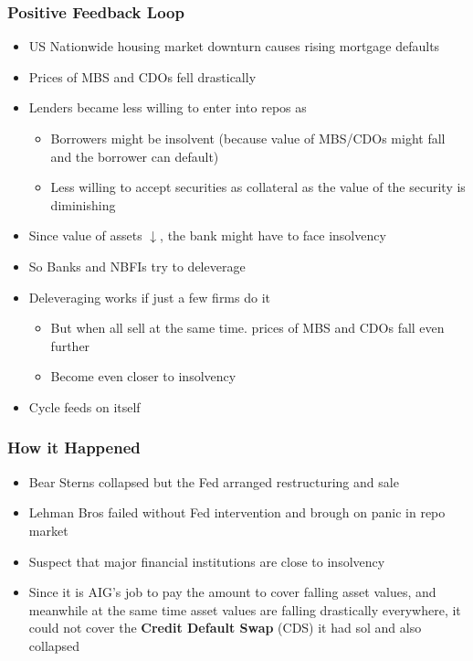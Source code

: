 \documentclass{article}
\begin{document}
\begin{multicols}{2}
\subsubsection{Positive Feedback Loop}
\begin{itemize}
	\item US Nationwide housing market downturn causes rising mortgage defaults
	\item Prices of MBS and CDOs fell drastically
	\item Lenders became less willing to enter into repos as
	\begin{itemize}
		\item Borrowers might be insolvent (because value of MBS/CDOs might fall and the borrower can default)
		\item Less willing to accept securities as collateral as the value of the security is diminishing
	\end{itemize}
    \item Since value of assets $\downarrow$, the bank might have to face insolvency
    \item So Banks and NBFIs try to deleverage
    \item Deleveraging works if just a few firms do it
    \begin{itemize}
    	\item But when all sell at the same time. prices of MBS and CDOs fall even further
    	\item Become even closer to insolvency
    \end{itemize}
    \item Cycle feeds on itself
\end{itemize}
\subsubsection{How it Happened}
\begin{itemize}
	\item Bear Sterns collapsed but the Fed arranged restructuring and sale
	\item Lehman Bros failed without Fed intervention and brough on panic in repo market
	\item Suspect that major financial institutions are close to insolvency
	\item Since it is AIG's job to pay the amount to cover falling asset values, and meanwhile at the same time asset values are falling drastically everywhere, it could not cover the \textbf{Credit Default Swap} (CDS) it had sol and also collapsed
\end{itemize}


\end{multicols}
\end{document}
